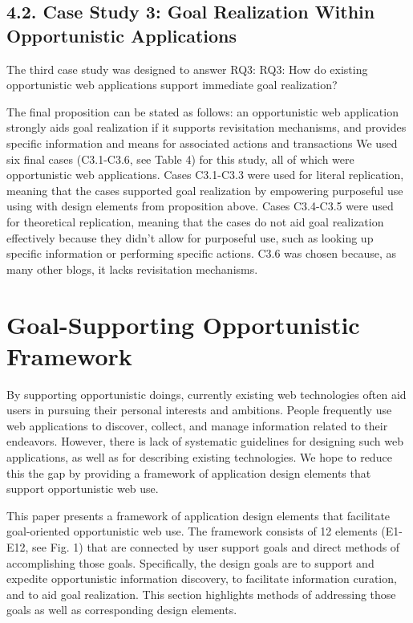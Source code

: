 \documentclass{casconpaper}
\begin{document}
{\subsection{4.2. Case Study 3: Goal Realization Within Opportunistic Applications}
The third case study was designed to answer RQ3:
RQ3: How do existing opportunistic web applications support immediate goal realization?

The final proposition can be stated as follows: an opportunistic web application strongly aids goal realization if it supports revisitation mechanisms, and provides specific information and means for associated actions and transactions We used six final cases (C3.1-C3.6, see Table 4) for this study, all of which were opportunistic web applications. Cases C3.1-C3.3 were used for literal replication, meaning that the cases supported goal realization by empowering purposeful use using with design elements from proposition above. Cases C3.4-C3.5 were used for theoretical replication, meaning that the cases do not aid goal realization effectively because they didn’t allow for purposeful use, such as looking up specific information or performing specific actions. C3.6 was chosen because, as many other blogs, it lacks revisitation mechanisms. 

} %


{\section{Goal-Supporting Opportunistic Framework}

By supporting opportunistic doings, currently existing web technologies often aid users in pursuing their personal interests and ambitions. People frequently use web applications to discover, collect, and manage information related to their endeavors. However, there is lack of systematic guidelines for designing such web applications, as well as for describing existing technologies. We hope to reduce this the gap by providing a framework of application design elements that support opportunistic web use. 

This paper presents a framework of application design elements that facilitate goal-oriented opportunistic web use. The framework consists of 12 elements (E1-E12, see Fig. 1) that are connected by user support goals and direct methods of accomplishing those goals. Specifically, the design goals are to support and expedite opportunistic information discovery, to facilitate information curation, and to aid goal realization. This section highlights methods of addressing those goals as well as corresponding design elements.

} %
\end{document}
